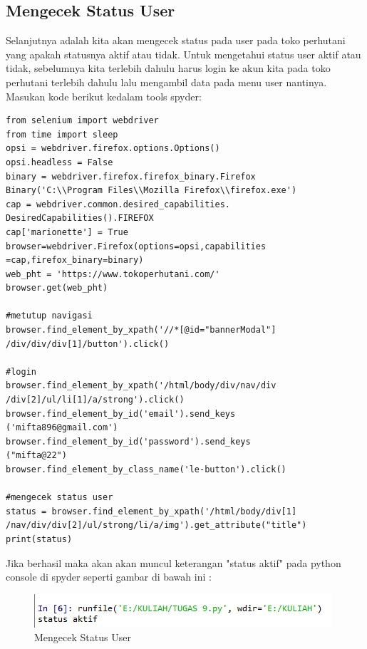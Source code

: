\newpage
\subsection{Mengecek Status User}
Selanjutnya adalah kita akan mengecek status pada user pada toko perhutani yang apakah statusnya aktif atau tidak. Untuk mengetahui status user aktif atau tidak, sebelumnya kita terlebih dahulu harus login ke akun kita pada toko perhutani terlebih dahulu lalu mengambil data pada menu user nantinya.
Masukan kode berikut kedalam tools spyder:
\begin{verbatim}
from selenium import webdriver
from time import sleep
opsi = webdriver.firefox.options.Options()
opsi.headless = False
binary = webdriver.firefox.firefox_binary.Firefox
Binary('C:\\Program Files\\Mozilla Firefox\\firefox.exe')
cap = webdriver.common.desired_capabilities.
DesiredCapabilities().FIREFOX
cap['marionette'] = True
browser=webdriver.Firefox(options=opsi,capabilities
=cap,firefox_binary=binary)
web_pht = 'https://www.tokoperhutani.com/'
browser.get(web_pht)

#metutup navigasi
browser.find_element_by_xpath('//*[@id="bannerModal"]
/div/div/div[1]/button').click()

#login
browser.find_element_by_xpath('/html/body/div/nav/div
/div[2]/ul/li[1]/a/strong').click()
browser.find_element_by_id('email').send_keys
('mifta896@gmail.com')
browser.find_element_by_id('password').send_keys
("mifta@22")
browser.find_element_by_class_name('le-button').click()

#mengecek status user
status = browser.find_element_by_xpath('/html/body/div[1]
/nav/div/div[2]/ul/strong/li/a/img').get_attribute("title")
print(status)
\end{verbatim}

\newpage
Jika berhasil maka akan akan muncul keterangan "status aktif" pada python console di spyder seperti gambar di bawah ini :
\begin{figure}[h]
	\centering
	\includegraphics[scale=0.8]{figures/status_user_aktif}
	\caption{Mengecek Status User}
\end{figure}
